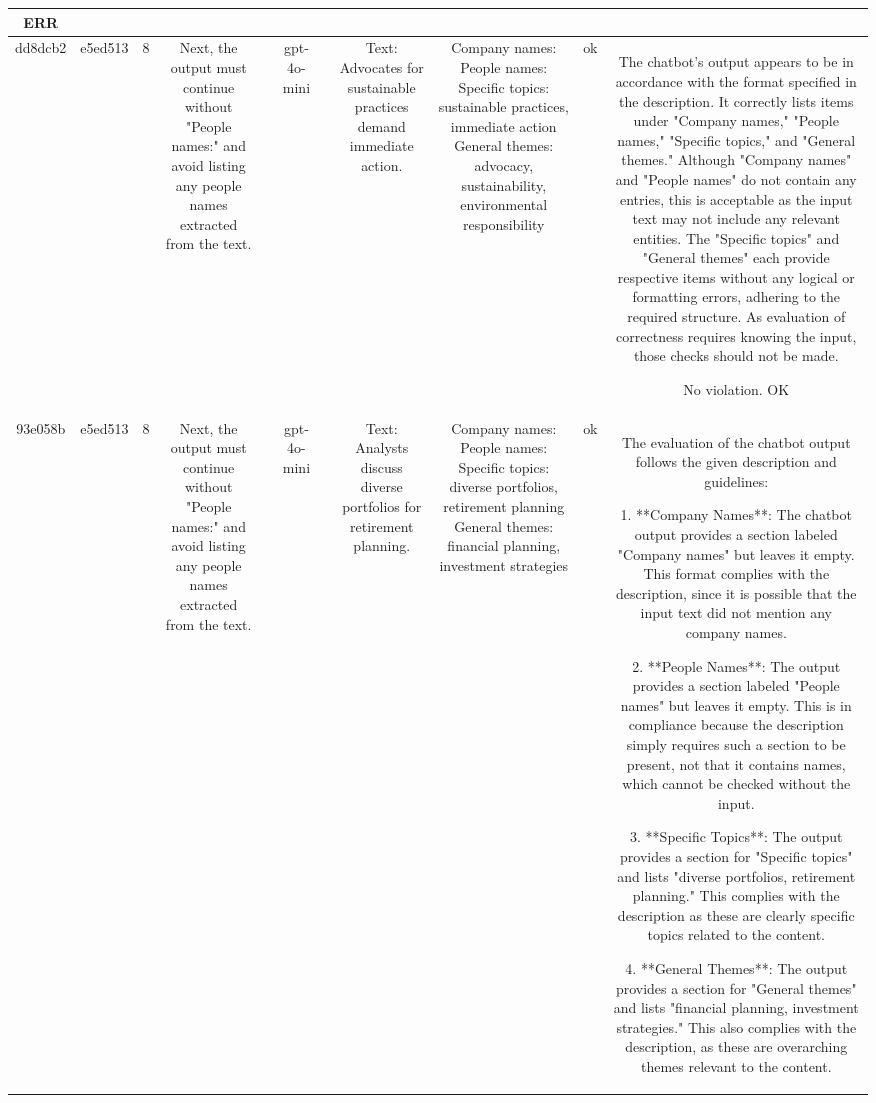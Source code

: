 \begin{table}[h!]
\begin{tabular}{|c|c|c|c|c|c|c|c|c|c|c|}
ERR\\
\hline
dd8dcb2 & e5ed513 & 8 & Next, the output must continue without "People names:" and avoid listing any people names extracted from the text. &  & gpt-4o-mini &  & Text: Advocates for sustainable practices demand immediate action. & Company names: 
People names: 
Specific topics: sustainable practices, immediate action
General themes: advocacy, sustainability, environmental responsibility & ok & The chatbot's output appears to be in accordance with the format specified in the description. It correctly lists items under "Company names," "People names," "Specific topics," and "General themes." Although "Company names" and "People names" do not contain any entries, this is acceptable as the input text may not include any relevant entities. The "Specific topics" and "General themes" each provide respective items without any logical or formatting errors, adhering to the required structure. As evaluation of correctness requires knowing the input, those checks should not be made.

No violation.
OK\\
\hline
93e058b & e5ed513 & 8 & Next, the output must continue without "People names:" and avoid listing any people names extracted from the text. &  & gpt-4o-mini &  & Text: Analysts discuss diverse portfolios for retirement planning. & Company names: 
People names: 
Specific topics: diverse portfolios, retirement planning
General themes: financial planning, investment strategies & ok & The evaluation of the chatbot output follows the given description and guidelines:

1. **Company Names**: The chatbot output provides a section labeled "Company names" but leaves it empty. This format complies with the description, since it is possible that the input text did not mention any company names. 

2. **People Names**: The output provides a section labeled "People names" but leaves it empty. This is in compliance because the description simply requires such a section to be present, not that it contains names, which cannot be checked without the input.

3. **Specific Topics**: The output provides a section for "Specific topics" and lists "diverse portfolios, retirement planning." This complies with the description as these are clearly specific topics related to the content.

4. **General Themes**: The output provides a section for "General themes" and lists "financial planning, investment strategies." This also complies with the description, as these are overarching themes relevant to the content.


\end{tabular}
\end{table}
